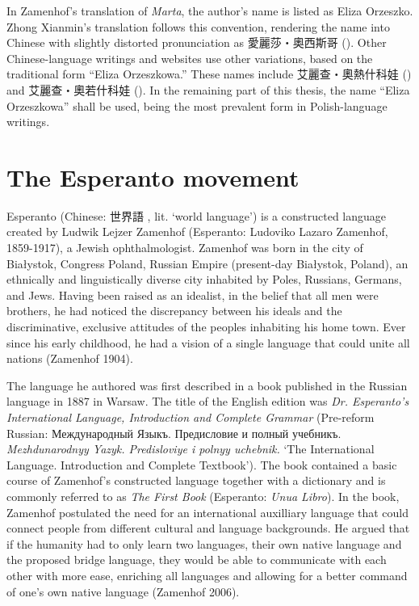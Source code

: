 In Zamenhof's translation of \textit{Marta}, the author's name is listed as Eliza Orzeszko.
Zhong Xianmin's translation follows this convention, rendering the name into Chinese with slightly distorted pronunciation as 愛麗莎・奧西斯哥 ().
Other Chinese-language writings and websites use other variations, based on the traditional form ``Eliza Orzeszkowa.''
These names include 艾麗查・奧熱什科娃 () and 艾麗查・奧若什科娃 (). In the remaining part of this thesis, the name ``Eliza Orzeszkowa'' shall be used, being the most prevalent form in Polish-language writings.

\section{The Esperanto movement}

Esperanto (Chinese: 世界語 , lit. `world language') is a constructed language created by Ludwik Lejzer Zamenhof (Esperanto: Ludoviko Lazaro Zamenhof, 1859-1917), a Jewish ophthalmologist.
Zamenhof was born in the city of Białystok, Congress Poland, Russian Empire (present-day Białystok, Poland), an ethnically and linguistically diverse city inhabited by Poles, Russians, Germans, and Jews.
Having been raised as an idealist, in the belief that all men were brothers, he had noticed the discrepancy between his ideals and the discriminative, exclusive attitudes of the peoples inhabiting his home town.
Ever since his early childhood, he had a vision of a single language that could unite all nations (Zamenhof 1904).

The language he authored was first described in a book published in the Russian language in 1887 in Warsaw. The title of the English edition was \textit{Dr. Esperanto's International Language, Introduction and Complete Grammar} (Pre-reform Russian: Между\-на\-род\-ный Языкъ. Предисловие и полный учебникъ. \textit{Mezhdunarodnyy Yazyk. Predisloviye i polnyy uchebnik.} `The International Language. Introduction and Complete Textbook').
The book contained a basic course of Zamenhof's constructed language together with a dictionary and is commonly referred to as \textit{The First Book} (Esperanto: \textit{Unua Libro}).
In the book, Zamenhof postulated the need for an international auxilliary language that could connect people from different cultural and language backgrounds.
He argued that if the humanity had to only learn two languages, their own native language and the proposed bridge language, they would be able to communicate with each other with more ease, enriching all languages and allowing for a better command of one's own native language (Zamenhof 2006).

